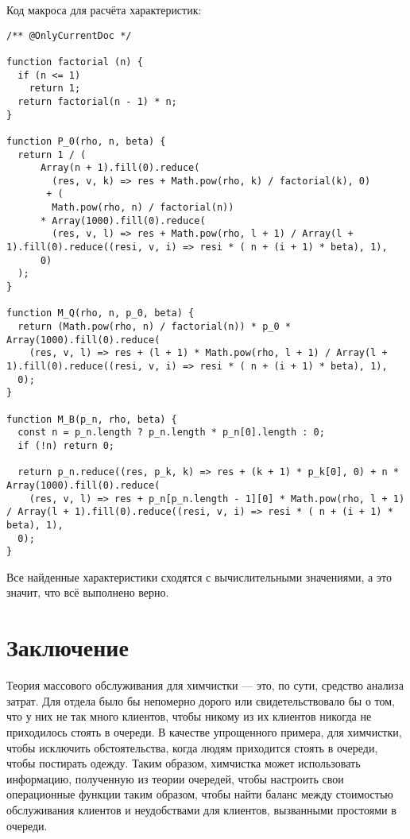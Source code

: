 \documentclass[14pt]{extarticle}
\begin{document}
    Код макроса для расчёта характеристик:
    \begin{verbatim}
/** @OnlyCurrentDoc */

function factorial (n) {
  if (n <= 1)
    return 1;
  return factorial(n - 1) * n;
}

function P_0(rho, n, beta) {
  return 1 / (
      Array(n + 1).fill(0).reduce(
        (res, v, k) => res + Math.pow(rho, k) / factorial(k), 0)
       + (
        Math.pow(rho, n) / factorial(n))
      * Array(1000).fill(0).reduce(
        (res, v, l) => res + Math.pow(rho, l + 1) / Array(l + 1).fill(0).reduce((resi, v, i) => resi * ( n + (i + 1) * beta), 1),
      0)
  );
}

function M_Q(rho, n, p_0, beta) {
  return (Math.pow(rho, n) / factorial(n)) * p_0 * Array(1000).fill(0).reduce(
    (res, v, l) => res + (l + 1) * Math.pow(rho, l + 1) / Array(l + 1).fill(0).reduce((resi, v, i) => resi * ( n + (i + 1) * beta), 1),
  0);
}

function M_B(p_n, rho, beta) {
  const n = p_n.length ? p_n.length * p_n[0].length : 0;
  if (!n) return 0;

  return p_n.reduce((res, p_k, k) => res + (k + 1) * p_k[0], 0) + n * Array(1000).fill(0).reduce(
    (res, v, l) => res + p_n[p_n.length - 1][0] * Math.pow(rho, l + 1) / Array(l + 1).fill(0).reduce((resi, v, i) => resi * ( n + (i + 1) * beta), 1),
  0);
}
    \end{verbatim}

    Все найденные характеристики сходятся с вычислительными значениями, а это значит, что всё выполнено верно.

    \newpage
    \section*{Заключение}

    Теория массового обслуживания для химчистки --- это, по сути, средство анализа затрат. Для отдела было бы непомерно дорого или свидетельствовало бы о том, что у них не так много клиентов, чтобы никому из их клиентов никогда не приходилось стоять в очереди. В качестве упрощенного примера, для химчистки, чтобы исключить обстоятельства, когда людям приходится стоять в очереди, чтобы постирать одежду. Таким образом, химчистка может использовать информацию, полученную из теории очередей, чтобы настроить свои операционные функции таким образом, чтобы найти баланс между стоимостью обслуживания клиентов и неудобствами для клиентов, вызванными простоями в очереди.
\end{document}
